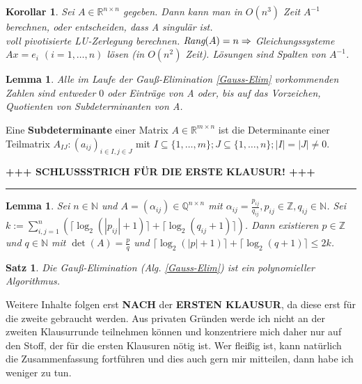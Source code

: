 \documentclass[12pt,a4paper]{article}
\theoremstyle{plain}
\newtheorem{Satz}[Theorem]{Satz}
\newtheorem{Lemma}[Theorem]{Lemma}
\newtheorem{Korollar}[Theorem]{Korollar}
\newcommand{\N}{\mathbb{N}}
\newcommand{\R}{\mathbb{R}}
\newcommand{\Z}{\mathbb{Z}}
\numberwithin{equation}{section}
\begin{document}
\begin{Korollar}
Sei $A\in\R^{n\times n}$ gegeben. Dann kann man in $O(n^3)$ Zeit $A^{-1}$ berechnen, oder entscheiden, dass A singulär ist.\\
voll pivotisierte LU-Zerlegung berechnen. $\emph{Rang}(A)=n\Rightarrow$ Gleichungssysteme $Ax=e_i$  $(i=1,\ldots,n)$ lösen (in $O(n^2)$ Zeit). Lösungen sind Spalten von $A^{-1}$.
\end{Korollar}
\begin{Lemma}
Alle im Laufe der Gauß-Elimination \ref{Gauss-Elim} vorkommenden Zahlen sind entweder $0$ oder Einträge von A oder, bis auf das Vorzeichen, Quotienten von Subdeterminanten von A.
\end{Lemma}
Eine \textbf{Subdeterminante} einer Matrix $A\in\R^{m\times n}$ ist die Determinante einer Teilmatrix $A_{IJ}:(a_{ij})_{i\in I, j\in J}$ mit $I\subseteq\{1,\ldots,m\}; J\subseteq\{1,\ldots,n\}; |I|=|J|\neq 0$. 
\begin{center}{\textbf{\textsc{+++ SCHLUSSSTRICH FÜR DIE ERSTE KLAUSUR! +++}}} \end{center}
\rule{\textwidth}{3pt}
\begin{Lemma}
Sei $n\in\N$ und $A=(\alpha_{ij})\in\mathbb{Q}^{n\times n}$ mit $\alpha_{ij}=\frac{p_{ij}}{q_{ij}},p_{ij}\in\Z,q_{ij}\in\N$. Sei $k:=\sum_{i,j=1}^n\left(\lceil\log_2(|p_{ij}|+1)\rceil+\lceil\log_2(q_{ij}+1)\rceil\right)$. Dann existieren $p\in\Z$ und $q\in\N$ mit $\det(A)=\frac{p}{q}$ und $\lceil\log_2(|p|+1)\rceil+\lceil\log_2(q+1)\rceil\leq 2k$.
\end{Lemma}
\begin{Satz}
Die Gauß-Elimination (Alg. \ref{Gauss-Elim}) ist ein polynomieller Algorithmus.
\end{Satz}
Weitere Inhalte folgen erst \textbf{NACH} der \textbf{ERSTEN KLAUSUR}, da diese erst für die zweite gebraucht werden. Aus privaten Gründen werde ich nicht an der zweiten Klausurrunde teilnehmen können und konzentriere mich daher nur auf den Stoff, der für die ersten Klausuren nötig ist.
Wer fleißig ist, kann natürlich die Zusammenfassung fortführen und dies auch gern mir mitteilen, dann habe ich weniger zu tun.
\end{document}

